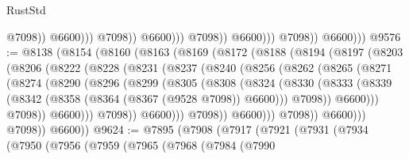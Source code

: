 \begin{lexlean}{RustStd}
\begin{coremodule}
                                            @7098))
                                        @6600)))
                                  @7098))
                              @6600)))
                        @7098))
                    @6600)))
              @7098))
          @6600)))
@9576 := @8138
    (@8154
      (@8160
        (@8163
          (@8169
            (@8172
              (@8188
                (@8194
                  (@8197
                    (@8203
                      (@8206
                        (@8222
                          (@8228
                            (@8231
                              (@8237
                                (@8240
                                  (@8256
                                    (@8262
                                      (@8265
                                        (@8271
                                          (@8274
                                            (@8290
                                              (@8296
                                                (@8299
                                                  (@8305
                                                    (@8308
                                                      (@8324
                                                        (@8330
                                                          (@8333
                                                            (@8339
                                                              (@8342
                                                                (@8358
                                                                  (@8364
                                                                    (@8367 (@9528 @7098))
                                                                    @6600)))
                                                              @7098))
                                                          @6600)))
                                                    @7098))
                                                @6600)))
                                          @7098))
                                      @6600)))
                                @7098))
                            @6600)))
                      @7098))
                  @6600)))
            @7098))
        @6600))
@9624 := @7895
    (@7908
      (@7917
        (@7921
          (@7931
            (@7934
              (@7950
                (@7956
                  (@7959
                    (@7965
                      (@7968
                        (@7984
                          (@7990

\end{coremodule}
\end{lexlean}
